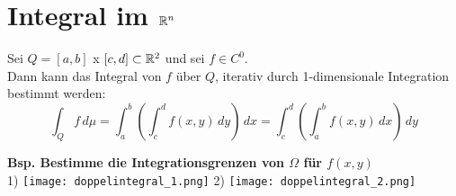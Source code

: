 \section{Integral im $\mathbb{R}^n$}
\begin{satz}[Fubini] Sei $Q = [a, b]$ x $[c, d] \subset \mathbb{R}^2$ und sei $f \in C^0$.\\
Dann kann das Integral von $f$ über $Q$, iterativ durch 1-dimensionale  Integration bestimmt werden:
\[
	\int_Q f \, d\mu = 
	\int_a^b \left( \int_c^d f(x, y) \, dy \right) \, dx = 
	\int_c^d \left( \int_a^b f(x, y) \, dx \right) \, dy
\]
\end{satz}

\textbf{Bsp. Bestimme die Integrationsgrenzen von $\Omega$ für $f(x, y)$}\\
1) \texttt{[image: doppelintegral\_1.png]} \hspace{1cm} 2) \texttt{[image: doppelintegral\_2.png]}
